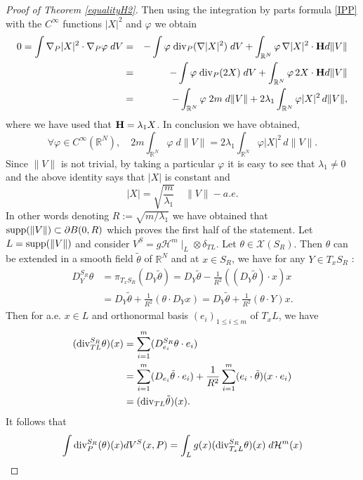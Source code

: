 \documentclass[12pt,english]{smfart} %
\theoremstyle{remark}
\newcommand{\R}{\mathbb{R}}
\newcommand{\HH}{\mathcal{H}} %
\newcommand{\Hm}{{\bf H}}
\begin{document}
\begin{proof}[Proof of Theorem \ref{equalityH2}]
Then using the integration by parts formula \eqref{IPP} with the $C^\infty$ functions $|X|^2$ and $\varphi$ we obtain
 \begin{eqnarray}
 0= \int  \nabla_P |X|^2 \cdot \nabla_P \varphi \;dV &=& -\int  \varphi \; {\rm div}_P(\nabla |X|^2) \; dV + \int_{\mathbb{R}^N} \varphi\,  \nabla |X|^2 \cdot \Hm d\|  V\| \notag \\
 &=& -\int  \varphi \; {\rm div}_P(2X) \; dV + \int_{\mathbb{R}^N} \varphi\, 2X \cdot \Hm d\|  V\| \notag \\
 &=& -\int_{\R^N}  \varphi \; 2m \; d\|V\| + 2\lambda_1 \int_{\mathbb{R}^N} \varphi  |X|^2\,  d\|  V\|,
 \end{eqnarray} 
where we have used that $\Hm=\lambda_1 X$. In conclusion we have obtained, 
$$\forall \varphi\in C^{\infty}(\R^N), \quad 2m\int_{\R^N}  \varphi  \; d\|V\| = 2\lambda_1 \int_{\mathbb{R}^N} \varphi  |X|^2\,  d\|  V\|.$$
Since $\|V\|$ is not trivial, by taking a particular $\varphi$ it is easy to see  that $\lambda_1 \not =0$ and the above identity says that $|X|$ is constant and 
$$|X|=\sqrt{\frac{m}{\lambda_1}} \quad \|V\|-a.e.$$ In other words denoting $R:=\sqrt{m/\lambda_1}$ we   have obtained that ${\rm supp}(\|V\|) \subset \partial B(0,R)$ which proves the first half of the statement. Let $L={\rm supp}(\|V\|)$ and consider $V^S=g\HH^m\mid_{L}\otimes\delta_{TL}$. Let $\theta\in\mathcal{X}(S_R)$. Then $\theta$ can be extended in a smooth field $\tilde{\theta}$ of $\R^N$ and at $x\in S_R$, we have for any $Y\in T_xS_R$ :
\begin{align*}
D^{S_R}_Y\theta&=\pi_{T_xS_R}(D_Y\tilde{\theta})=D_Y\tilde{\theta}-\frac{1}{R^2}((D_Y\tilde{\theta})\cdot x)x\\
&=D_Y\tilde{\theta}+\frac{1}{R^2}(\theta\cdot D_Yx) =D_Y\tilde{\theta}+\frac{1}{R^2}(\theta\cdot Y)x.
\end{align*}
Then for a.e. $x\in L$ and orthonormal basis $(e_i)_{1\leqslant i\leqslant m}$ of $T_xL$, we have 
\begin{align*}
({\rm div}^{S_R}_{TL}\theta)(x)&=\sum_{i=1}^m(D^{S_R}_{e_i}\theta\cdot e_i)\\
&=\sum_{i=1}^m(D_{e_i}\tilde{\theta}\cdot e_i)+\frac{1}{R^2}\sum_{i=1}^m(e_i\cdot\tilde{\theta})(x\cdot e_i)\\
&=({\rm div}_{TL}\tilde{\theta})(x).
\end{align*} 
It follows that
\begin{align*}
\int{\rm div}^{S_R}_P(\theta)(x)dV^S(x,P)&=\int_{L}g(x)({\rm div}^{S_R}_{T_xL}\theta)(x) \;d\mathcal{H}^m(x)\\

\end{align*}
\end{proof}
\end{document}
